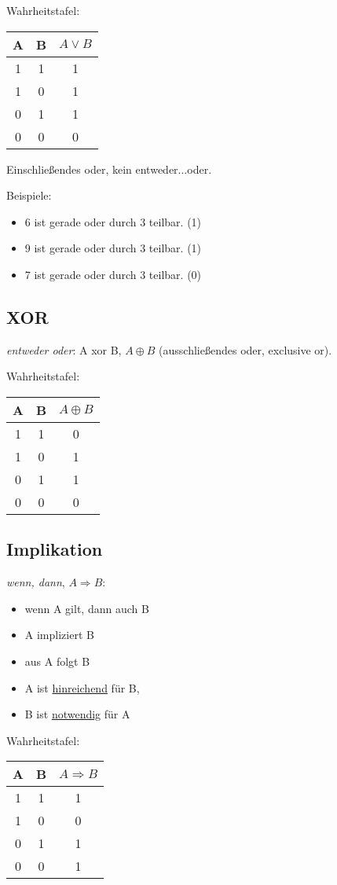 \documentclass[a4paper, 12pt, twoside] {article}
\newcommand{\attention}{{\fontencoding{U}\fontfamily{futs}\selectfont\char 66\relax}\space}
\begin{document}
Wahrheitstafel: \qquad
\begin{tabular}{| c c | c |}
\hline
A & B & $A \lor B$ \\
\hline
1 & 1 & 1 \\
1 & 0 & 1 \\
0 & 1 & 1 \\
0 & 0 & 0 \\
\hline
\end{tabular}

\attention Einschließendes oder, kein entweder...oder.

Beispiele:
\begin{itemize}
\item 6 ist gerade oder durch 3 teilbar. (1)
\item 9 ist gerade oder durch 3 teilbar. (1)
\item 7 ist gerade oder durch 3 teilbar. (0)
\end{itemize}

\subsection{XOR} %
\textit{entweder oder}: A xor B, $A \oplus B$ (ausschließendes oder, exclusive or).

Wahrheitstafel: \qquad
\begin{tabular}{| c c | c |}
\hline
A & B & $A \oplus B$ \\
\hline
1 & 1 & 0 \\
1 & 0 & 1 \\
0 & 1 & 1 \\
0 & 0 & 0 \\
\hline
\end{tabular}

\subsection{Implikation} %
\textit{wenn, dann}, $A \Rightarrow B$:
\begin{itemize}
\item wenn A gilt, dann auch B
\item A impliziert B
\item aus A folgt B
\item A ist \underline{hinreichend} für B,
\item B ist \underline{notwendig} für A
\end{itemize}

Wahrheitstafel: \qquad
\begin{tabular}{| c c | c |}
\hline
A & B & $A \Rightarrow B$ \\
\hline
1 & 1 & 1 \\
1 & 0 & 0 \\
0 & 1 & 1 \\
0 & 0 & 1 \\
\hline
\end{tabular}
\end{document}
